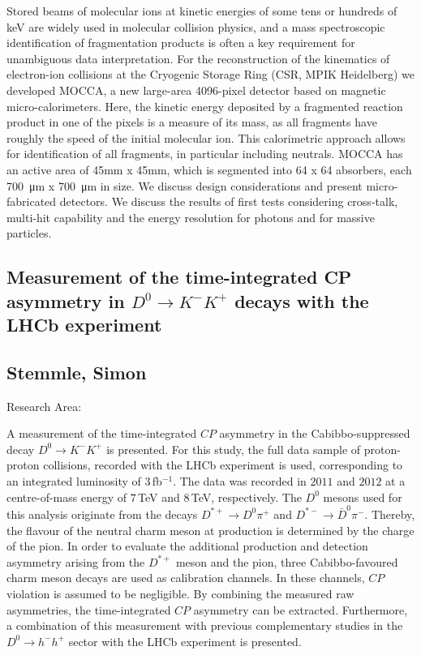 \noindent Stored beams of molecular ions at kinetic energies of some tens or hundreds of keV are widely used in molecular collision physics, and a mass spectroscopic identification of fragmentation products is often a key requirement for unambiguous data interpretation. For the reconstruction of the kinematics of electron-ion collisions at the Cryogenic Storage Ring (CSR, MPIK Heidelberg) we developed MOCCA, a new large-area 4096-pixel detector based on magnetic micro-calorimeters. Here, the kinetic energy deposited by a fragmented reaction product in one of the pixels is a measure of its mass, as all fragments have roughly the speed of the initial molecular ion. This calorimetric approach allows for identification of all fragments, in particular including neutrals. MOCCA has an active area of 45mm x 45mm, which is segmented into 64 x 64 absorbers, each \SI{700}{\micro m} x \SI{700}{\micro m} in size.
\newline
We discuss design considerations and present micro-fabricated detectors. We discuss the results of first tests considering cross-talk, multi-hit capability and the energy resolution for photons and for massive particles.
\subsection*{\centering \large Measurement of the time-integrated CP asymmetry in $D^0\rightarrow K^-K^+$ decays with the LHCb experiment}
\subsection*{\centering \normalsize Stemmle, Simon}
Research Area: \newline

\noindent A measurement of the time-integrated $CP$ asymmetry in the Cabibbo-suppressed decay $D^0\rightarrow K^-K^+$ is presented. For this study, the full data sample of proton-proton collisions, recorded with the LHCb experiment is used, corresponding to an integrated luminosity of $3\,$fb$^{-1}$. The data was recorded in $2011$ and $2012$ at a centre-of-mass energy of $7\,$TeV and $8\,$TeV, respectively. The $D^0$ mesons used for this analysis originate from the decays $D^{*+}\rightarrow D^0\pi^+$ and $D^{*-}\rightarrow \bar{D}^0\pi^-$. Thereby, the flavour of the neutral charm meson at production is determined by the charge of the pion. In order to evaluate the additional production and detection asymmetry arising from the $D^{*+}$ meson and the pion, three Cabibbo-favoured charm meson decays are used as calibration channels. In these channels, $CP$ violation is assumed to be negligible. By combining the measured raw asymmetries, the time-integrated $CP$ asymmetry can be extracted. Furthermore, a combination of this measurement with previous complementary studies in the $D^0\rightarrow h^-h^+$ sector with the LHCb experiment is presented.
\newpage

